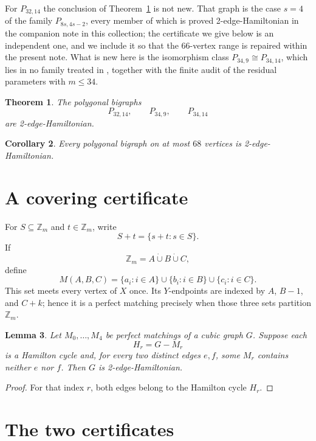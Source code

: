 \documentclass[11pt]{amsart}
\newtheorem{theorem}{Theorem}
\newtheorem{lemma}[theorem]{Lemma}
\newtheorem{corollary}[theorem]{Corollary}
\newcommand{\Z}{\mathbb Z}
\begin{document}
For $P_{32,14}$ the conclusion of Theorem~\ref{thm:main} is not new. That
graph is the case $s=4$ of the family $P_{8s,4s-2}$, every member of which
is proved 2-edge-Hamiltonian in the companion note \cite{Companion} in
this collection; the certificate we give below is an independent one, and
we include it so that the $66$-vertex range is repaired within the present
note. What is new here is the isomorphism class
$P_{34,9}\cong P_{34,14}$, which lies in no family treated in
\cite{Companion}, together with the finite audit of the residual
parameters with $m\le34$.

\begin{theorem}\label{thm:main}
The polygonal bigraphs
\[
 P_{32,14},
 \qquad
 P_{34,9},
 \qquad
 P_{34,14}
\]
are 2-edge-Hamiltonian.
\end{theorem}

\begin{corollary}\label{cor:68}
Every polygonal bigraph on at most $68$ vertices is 2-edge-Hamiltonian.
\end{corollary}

\section{A covering certificate}

For $S\subseteq\Z_m$ and $t\in\Z_m$, write
\[
 S+t=\{s+t:s\in S\}.
\]
If
\[
 \Z_m=A\mathbin{\dot\cup}B\mathbin{\dot\cup}C,
\]
define
\[
 M(A,B,C)
 =
 \{a_i:i\in A\}
 \cup
 \{b_i:i\in B\}
 \cup
 \{c_i:i\in C\}.
\]
This set meets every vertex of $X$ once. Its $Y$-endpoints are indexed by
$A$, $B-1$, and $C+k$; hence it is a perfect matching precisely when those
three sets partition $\Z_m$.

\begin{lemma}\label{lem:cover}
Let $M_0,\dots,M_4$ be perfect matchings of a cubic graph $G$. Suppose each
\[
 H_r=G-M_r
\]
is a Hamilton cycle and, for every two distinct edges $e,f$, some $M_r$
contains neither $e$ nor $f$. Then $G$ is 2-edge-Hamiltonian.
\end{lemma}

\begin{proof}
For that index $r$, both edges belong to the Hamilton cycle $H_r$.
\end{proof}

\section{The two certificates}
\end{document}
